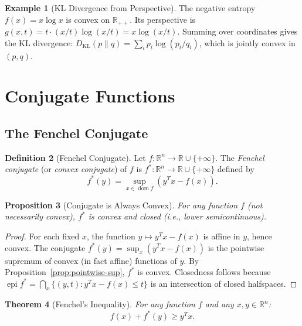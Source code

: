 \documentclass[11pt,a4paper]{article}
\newtheorem{theorem}{Theorem}[section]
\newtheorem{proposition}[theorem]{Proposition}
\theoremstyle{definition}
\newtheorem{definition}[theorem]{Definition}
\newtheorem{example}[theorem]{Example}
\theoremstyle{remark}
\newcommand{\R}{\mathbb{R}}
\DeclareMathOperator{\dom}{dom}
\DeclareMathOperator{\epi}{epi}
\begin{document}
\begin{example}[KL Divergence from Perspective]
\label{ex:kl-perspective}
The negative entropy $f(x) = x \log x$ is convex on $\R_{++}$. Its perspective is
$g(x, t) = t \cdot (x/t) \log(x/t) = x \log(x/t)$. Summing over coordinates gives the
KL divergence: $D_{\text{KL}}(p \| q) = \sum_i p_i \log(p_i / q_i)$, which is jointly
convex in $(p, q)$.
\end{example}

\section{Conjugate Functions}

\subsection{The Fenchel Conjugate}

\begin{definition}[Fenchel Conjugate]
\label{def:conjugate}
Let $f : \R^n \to \R \cup \{+\infty\}$. The \emph{Fenchel conjugate} (or
\emph{convex conjugate}) of $f$ is $f^* : \R^n \to \R \cup \{+\infty\}$ defined by
\[
  f^*(y) = \sup_{x \in \dom f} \left( y^T x - f(x) \right).
\]
\end{definition}

\begin{proposition}[Conjugate is Always Convex]
\label{prop:conjugate-convex}
For any function $f$ (not necessarily convex), $f^*$ is convex and closed
(i.e., lower semicontinuous).
\end{proposition}

\begin{proof}
For each fixed $x$, the function $y \mapsto y^T x - f(x)$ is affine in $y$, hence
convex. The conjugate $f^*(y) = \sup_x (y^T x - f(x))$ is the pointwise supremum of
convex (in fact affine) functions of $y$. By Proposition~\ref{prop:pointwise-sup},
$f^*$ is convex. Closedness follows because $\epi f^* = \bigcap_x \{(y,t) :
y^T x - f(x) \le t\}$ is an intersection of closed halfspaces.
\end{proof}

\begin{theorem}[Fenchel's Inequality]
\label{thm:fenchel-inequality}
For any function $f$ and any $x, y \in \R^n$:
\[
  f(x) + f^*(y) \ge y^T x.
\]
\end{theorem}
\end{document}
